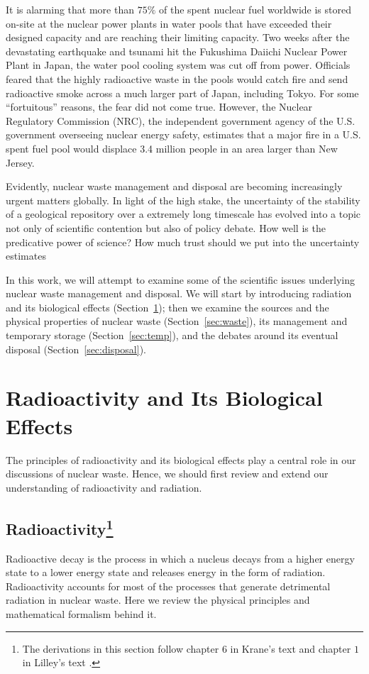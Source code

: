 \documentclass[nofootinbib,preprint,aps]{revtex4-1}
\begin{document}
It is alarming that more than $75\%$ of the spent nuclear fuel worldwide is stored on-site at the nuclear power plants
in water pools that have exceeded their designed capacity and are reaching their limiting capacity.\cite{aa12}
Two weeks after the devastating earthquake and tsunami hit the Fukushima Daiichi Nuclear Power Plant in Japan,
the water pool cooling system was cut off from power. Officials feared that
the highly radioactive waste in the pools would catch fire and send radioactive smoke
across a much larger part of Japan, including Tokyo.\cite{s16} For some ``fortuitous'' reasons, the fear did not come true.
However, the Nuclear Regulatory Commission (NRC), the independent government agency
of the U.S. government overseeing nuclear energy safety,
estimates that a major fire in a U.S. spent fuel pool would
displace 3.4 million people in an area larger than New Jersey.\cite{s16}

Evidently, nuclear waste management and disposal are becoming increasingly urgent matters globally.
In light of the high stake,
the uncertainty of the stability of a geological repository over a extremely long timescale has evolved into 
a topic not only of scientific contention but also of policy debate.
How well is the predicative power of science? How much trust should we put into the uncertainty estimates

In this work, we will attempt to examine some of the scientific issues underlying nuclear waste management
and disposal. We will start by introducing radiation and its biological effects (Section~\ref{sec:phys}); then
we examine the sources and the physical properties of nuclear waste (Section~\ref{sec:waste}),
its management and temporary storage (Section~\ref{sec:temp}), and the debates around its eventual disposal (Section~\ref{sec:disposal}).

\section{Radioactivity and Its Biological Effects}
\label{sec:phys}
The principles of radioactivity and its biological effects play a central role in our
discussions of nuclear waste. Hence, we should first review and extend our understanding of 
radioactivity and radiation.
    \subsection{Radioactivity\footnote{
    The derivations in this section follow chapter $6$ in
    Krane's text \cite{k88} and chapter $1$ in Lilley's text \cite{l01}.
    }}
    Radioactive decay is the process in which a nucleus decays from a higher energy state to a lower
    energy state and releases energy in the form of radiation. Radioactivity accounts for
    most of the processes that generate detrimental radiation in nuclear waste.
    Here we review the physical principles and mathematical formalism behind it.
\end{document}
